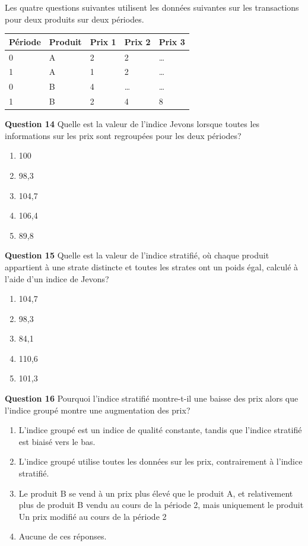 \documentclass[
]{article}
\begin{document}
Les quatre questions suivantes utilisent les données suivantes sur les transactions pour deux produits sur deux périodes.

\begin{longtable}[]{@{}lllll@{}}
\toprule
Période & Produit & Prix 1 & Prix 2 & Prix 3 \\
\midrule
\endhead
0 & A & 2 & 2 & \ldots{} \\
1 & A & 1 & 2 & \ldots{} \\
0 & B & 4 & \ldots{} & \ldots{} \\
1 & B & 2 & 4 & 8 \\
\bottomrule
\end{longtable}

\textbf{Question 14} Quelle est la valeur de l'indice Jevons lorsque toutes les informations sur les prix sont regroupées pour les deux périodes?

\begin{enumerate}
\def\labelenumi{\alph{enumi})}
\item
  100
\item
  98,3
\item
  104,7
\item
  106,4
\item
  89,8
\end{enumerate}

\textbf{Question 15} Quelle est la valeur de l'indice stratifié, où chaque produit appartient à une strate distincte et toutes les strates ont un poids égal, calculé à l'aide d'un indice de Jevons?

\begin{enumerate}
\def\labelenumi{\alph{enumi})}
\item
  104,7
\item
  98,3
\item
  84,1
\item
  110,6
\item
  101,3
\end{enumerate}

\textbf{Question 16} Pourquoi l'indice stratifié montre-t-il une baisse des prix alors que l'indice groupé montre une augmentation des prix?

\begin{enumerate}
\def\labelenumi{\alph{enumi})}
\item
  L'indice groupé est un indice de qualité constante, tandis que l'indice stratifié est biaisé
  vers le bas.
\item
  L'indice groupé utilise toutes les données sur les prix, contrairement à l'indice stratifié.
\item
  Le produit B se vend à un prix plus élevé que le produit A, et relativement plus de produit B
  vendu au cours de la période 2, mais uniquement le produit Un prix modifié au cours de la période 2
\item
  Aucune de ces réponses.
\end{enumerate}
\end{document}

